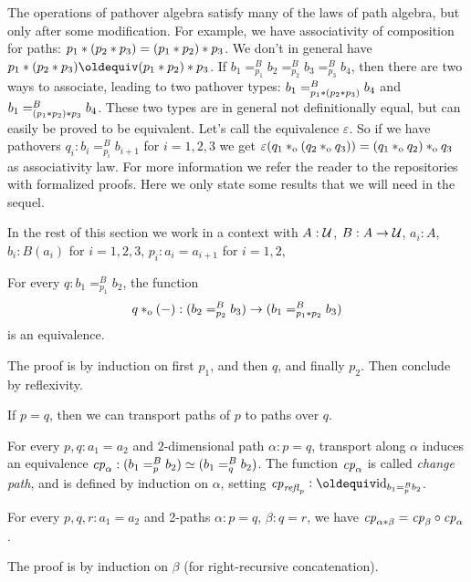 \documentclass[a4,12pt]{amsart}
\begin{document}
The operations of pathover algebra satisfy many of the laws of path algebra,
but only after some modification. For example, we have
associativity of composition for paths: $p_1*(p_2* p_3) = (p_1* p_2)* p_3$.
We don't in general have $p_1\ct(p_2\ct p_3) \jdeq (p_1\ct p_2)\ct p_3$.
If $b_1 =^B_{p_1} b_2 =^B_{p_2} b_3 =^B_{p_3} b_4$, then there are
two ways to associate, leading to two pathover types:
$b_1 =^B_{p_1* (p_2* p_3)} b_4$ and $b_1 =^B_{(p_1* p_2) * p_3} b_4$.
These two types are in general not definitionally equal,
but can easily be proved to be equivalent. Let's call the
equivalence $\varepsilon$. So if we have pathovers $q_i : b_i =^B_{p_i} b_{i+1}$
for $i=1,2,3$ we get $\varepsilon(q_1 *_{\mathrm{o}} (q_2 *_{\mathrm{o}} q_3)) = (q_1 *_{\mathrm{o}} q_2)*_{\mathrm{o}} q_3$
as associativity law. For more information we refer the reader to the
repositories with formalized proofs. Here we only state some results that
we will need in the sequel.

In the rest of this section we work in a context with
$A : \mathcal{U}$, $B : A \to \mathcal{U}$, $a_i:A$, $b_i:B(a_i)$ for $i=1,2,3$, 
$p_i : a_i = a_{i+1}$ for $i=1,2$,

\begin{lemma}\label{lem:concat-over}
  For every $q : b_1 =^B_{p_1} b_2$, the
  function
  \[
    q *_{\mathrm{o}} ({-}) : (b_2 =^B_{p_2} b_3) \to (b_1 =^B_{p_1* p_2} b_3)
  \]
  is an equivalence.
\end{lemma}
The proof is by induction on first $p_1$, and then $q$, and finally $p_2$.
Then conclude by reflexivity.

If $p=q$, then we can transport paths of $p$ to paths over $q$.

\begin{definition}\label{def:pathover-change-path}
  For every $p,q:a_1=a_2$ and $2$-dimensional path $\alpha : p = q$,
  transport along $\alpha$
  induces an equivalence $\mathit{cp}_{\alpha}: (b_1 =^B_p b_2) \simeq (b_1 =^B_q b_2)$.
  The function $\mathit{cp}_{\alpha}$ is called \emph{change path}, and is defined
  by induction on $\alpha$, setting $\cp{\refl{p}}\defeq \id_{b_1 =^B_p b_2}$.
\end{definition}

\begin{lemma}\label{lem:functorial-change-path}
  For every $p,q,r:a_1=a_2$ and 2-paths $\alpha : p = q$, $\beta : q = r$,
  we have $\mathit{cp}_{\alpha*\beta}=\mathit{cp}_{\beta}\circ\mathit{cp}_{\alpha}$.
\end{lemma}

The proof is by induction on $\beta$ (for right-recursive concatenation).
\end{document}
